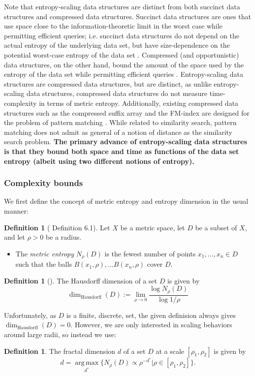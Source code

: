 \documentclass[review,preprint,12pt]{elsarticle}
\renewcommand{\cite}{\citep} %
\theoremstyle{definition}
\newtheorem{definition}[theorem]{Definition}
\theoremstyle{remark}
\begin{document}
Note that entropy-scaling data structures are distinct from both succinct data structures and compressed data structures.
Succinct data structures are ones that use space close to the information-theoretic limit in the worst case while permitting efficient queries; i.e.
succinct data structures do not depend on the actual entropy of the underlying data set, but have size-dependence on the potential worst-case entropy of the data set \cite{jacobson1988succinct}.
Compressed (and opportunistic) data structures, on the other hand, bound the amount of the space used by the entropy of the data set while permitting efficient queries \cite{grossi2005compressed, ferragina2000opportunistic}.
Entropy-scaling data structures are compressed data structures, but are distinct, as
unlike entropy-scaling data structures, compressed data structures do not measure time-complexity in terms of metric entropy.
Additionally, existing compressed data structures such as the compressed suffix array and the FM-index are designed for the problem of pattern matching \cite{grossi2005compressed, ferragina2000opportunistic}.
While related to similarity search, pattern matching does not admit as general of a notion of distance as the similarity search problem.
\textbf{The primary advance of entropy-scaling data structures is that they bound both space and time as functions of the data set entropy (albeit using two different notions of entropy).}

\subsubsection{Complexity bounds}
We first define the concept of metric entropy and entropy dimension in the usual manner:
\begin{definition}[\cite{tao2008product} Definition 6.1] 
    Let $X$ be a metric space, let $D$ be a subset of $X$, and let $\rho>0$ be a radius.
    \begin{itemize}
        \item The \textit{metric entropy} $N_\rho(D)$ is the fewest number of points $x_1, \ldots, x_n \in D$ such that the balls $B(x_1,\rho), \ldots B(x_n,\rho)$ cover $D$.
    \end{itemize}
\end{definition}
\begin{definition}[\cite{falconer1990fractal}]
    The Hausdorff dimension of a set $D$ is given by 
\[
    \dim_{\text{Hausdorff}}(D) := \lim_{\rho \to 0} \frac{\log N_\rho(D)}{\log 1/\rho}
\]
\end{definition}
Unfortunately, as $D$ is a finite, discrete, set, the given definision always gives $\dim_{\text{Hausdorff}}(D) = 0$.
However, we are only interested in scaling behaviors around large radii, so instead we use:
\begin{definition}
    The fractal dimension $d$ of a set $D$ at a scale $[\rho_1,\rho_2]$ is given by
    \[
        d = \operatorname*{arg\,max}_{d^*} \{ N_\rho(D) \propto \rho^{-d^*} | \rho \in [\rho_1,\rho_2] \}.
    \]
\end{definition}
\end{document}
